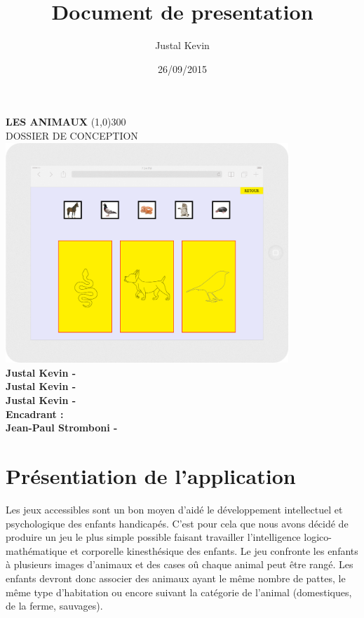 \documentclass{article}
\title{Document de presentation}
\author{Justal Kevin}
\date{26/09/2015}
\begin{document}
\begin{center}
\textbf{\Huge{LES ANIMAUX}}
\line(1,0){300}\\
DOSSIER DE CONCEPTION\\
\vspace{3cm}
\includegraphics[width=0.8\textwidth]{tablette}\\
\vspace{3cm}
\textbf{Justal Kevin -  \color{black}{- SI5 - IHM}}\\
\textbf{Justal Kevin -  \color{black}{- SI5 - IHM}}\\
\textbf{Justal Kevin -  \color{black}{- SI5 - IHM}}\\
\vspace{4cm}
\textbf{Encadrant :}\\
\textbf{Jean-Paul Stromboni - }
\end{center}

\newpage
\tableofcontents

\newpage

\section{Pr\'esentiation de l'application}
\hspace*{0.6cm}Les jeux accessibles sont un bon moyen d'aid\'e le d\'eveloppement intellectuel et psychologique des enfants handicap\'es. C'est pour cela que nous avons décidé de produire un jeu le plus simple possible faisant travailler l'intelligence logico-math\'ematique et corporelle kinesth\'esique des enfants. Le jeu confronte les enfants à plusieurs images d'animaux et des cases o\^u chaque animal peut \^etre rang\'e. Les enfants devront donc associer des animaux ayant le m\^eme nombre de pattes, le m\^eme type d'habitation ou encore suivant la cat\'egorie de l'animal (domestiques, de la ferme, sauvages).
\end{document}
